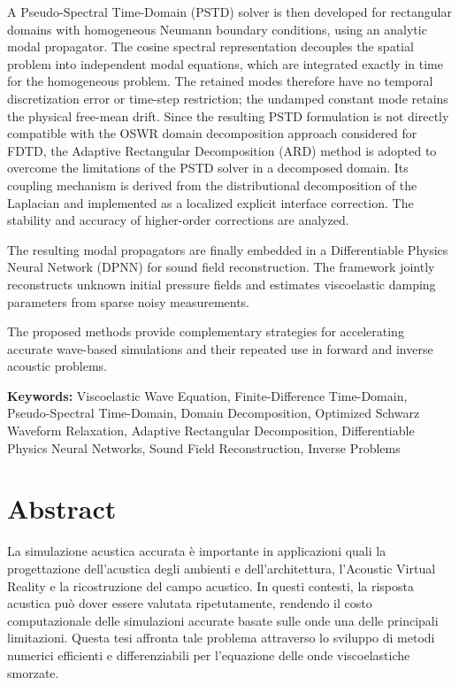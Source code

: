 \documentclass{Configuration_Files/PoliMi3i_thesis}
\begin{document}
A Pseudo-Spectral Time-Domain (PSTD) solver is then developed for
rectangular domains with homogeneous Neumann boundary conditions,
using an analytic modal propagator. The cosine spectral representation
decouples the spatial problem into independent modal equations, which
are integrated exactly in time for the homogeneous problem. The retained
modes therefore have no temporal discretization error or time-step
restriction; the undamped constant mode retains the physical free-mean
drift. Since the resulting PSTD
formulation is not directly compatible with the OSWR domain
decomposition approach considered for FDTD, the Adaptive Rectangular
Decomposition (ARD) method is adopted to overcome the limitations of
the PSTD solver in a decomposed domain. Its coupling mechanism is
derived from the distributional decomposition of the Laplacian and
implemented as a localized explicit interface correction. The
stability and accuracy of higher-order corrections are analyzed.

The resulting modal propagators are finally embedded in a
Differentiable Physics Neural Network (DPNN) for sound field
reconstruction. The framework jointly reconstructs unknown initial
pressure fields and estimates viscoelastic damping parameters from
sparse noisy measurements.

The proposed methods provide complementary strategies for accelerating
accurate wave-based simulations and their repeated use in forward and
inverse acoustic problems.

\textbf{Keywords:} Viscoelastic Wave Equation, Finite-Difference
Time-Domain, Pseudo-Spectral Time-Domain, Domain Decomposition,
Optimized Schwarz Waveform Relaxation, Adaptive Rectangular
Decomposition, Differentiable Physics Neural Networks, Sound Field
Reconstruction, Inverse Problems


\chapter*{Abstract}

La simulazione acustica accurata è importante in applicazioni quali
la progettazione dell'acustica degli ambienti e dell'architettura,
l'Acoustic Virtual Reality e la ricostruzione del campo acustico. In
questi contesti, la risposta acustica può dover essere valutata
ripetutamente, rendendo il costo computazionale delle simulazioni
accurate basate sulle onde una delle principali limitazioni. Questa
tesi affronta tale problema attraverso lo sviluppo di metodi numerici
efficienti e differenziabili per l'equazione delle onde
viscoelastiche smorzate.
\end{document}
